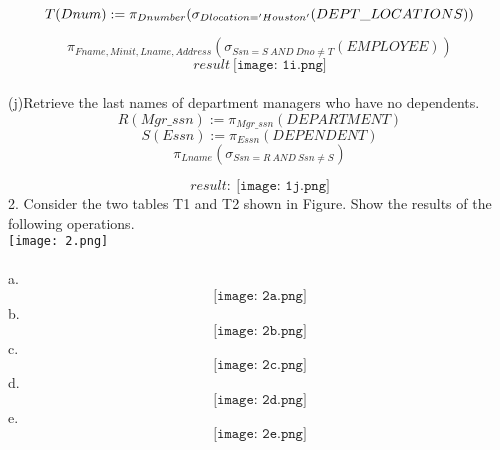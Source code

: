 \documentclass[paper=a4, fontsize=11pt]{scrartcl}
\begin{document}
$$T(Dnum) := \pi_{Dnumber}(\sigma_{Dlocation='Houston'}(DEPT\char`_LOCATIONS)) $$

$$\pi_{Fname,Minit,Lname,Address}(\sigma_{Ssn =S\ AND\ Dno \neq T}(EMPLOYEE))
$$
$$result\ \texttt{[image: 1i.png]}$$ \\
(j)Retrieve the last names of department managers who have no dependents.
$$R(Mgr\_ssn):=\pi_{Mgr\_ssn}(DEPARTMENT)$$
$$S(Essn):=\pi_{Essn}(DEPENDENT)$$
$$\pi_{Lname}(\sigma_{Ssn=R\ AND\ Ssn \neq S})$$

$$ result:\ \texttt{[image: 1j.png]}$$
2. Consider the two tables T1 and T2 shown in Figure. Show the results of the following operations.\\
\texttt{[image: 2.png]}\\ \\
a. $$\texttt{[image: 2a.png]}$$
b. $$\texttt{[image: 2b.png]}$$
c. $$\texttt{[image: 2c.png]}$$
d.$$\texttt{[image: 2d.png]}$$
e.$$\texttt{[image: 2e.png]}$$
\end{document}
